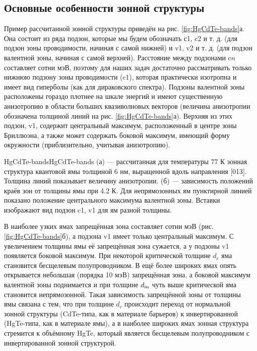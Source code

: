 \subsection{Основные особенности зонной структуры} \label{sec:HgCdTe-bandstructure}
Пример рассчитанной зонной структуры приведён на рис. \ref{fig:HgCdTe-bands}а. Она состоит из ряда подзон, которые мы будем обозначать с1, c2 и т. д. (для подзон зоны проводимости, начиная с самой нижней) и v1, v2 и т. д. (для подзон валентной зоны, начиная с самой верхней). Расстояние между подзонами c$n$ составляет сотни мэВ, поэтому для наших задач достаточно рассматривать только нижнюю подзону зоны проводимости (c1), которая практически изотропна и имеет вид гиперболы (как для дираковского спектра). Подзоны валентной зоны расположены гораздо плотнее на шкале энергий и имеют существенную анизотропию в области больших квазиволновых векторов (величина анизотропии обозначена толщиной линий на рис. \ref{fig:HgCdTe-bands}а). Верхняя из этих подзон, v1, содержит центральный максимум, расположенный в центре зоны Бриллюэна, а также может содержать боковой максимум, имеющий форму окружности (приблизительно, учитывая анизотропию).

\begin{fig}{HgCdTe-bands}{HgCdTe-bands} (а) --- рассчитанная для температуры 77 К зонная структура квантовой ямы \HgCdTe{} толщиной 6 нм, выращенной вдоль направления [013]. Толщина линий показывает величину анизотропии. (б) --- зависимость положений краёв зон от толщины ямы при 4.2 К. Для непрямозонных ям пунктирной линией показано положение центрального максимума валентной зоны. Вставки изображают вид подзон c1, v1 для ям разной толщины.
\end{fig}

В наиболее узких ямах запрещённая зона составляет сотни мэВ (рис. \ref{fig:HgCdTe-bands}б), а подзона v1 имеет только центральный максимум. С увеличением толщины ямы её запрещённая зона сужается, а у подзоны v1 появляется боковой максимум. При некоторой критической толщине $d_c$ яма становится бесщелевым полупроводником. В ещё более широких ямах опять открывается небольшая (порядка 10 мэВ) запрещённая зона, а боковой максимум валентной зоны поднимается и при толщине $d_{\rm in}$ чуть выше критической яма становится непрямозонной. Такая зависимость запрещённой зоны от толщины ямы связана с тем, что при толщине $d_c$ происходит переход от нормальной зонной структуры (CdTe-типа, как в материале барьеров) к инвертированной (HgTe-типа, как в материале ямы), а в наиболее широких ямах зонная структура стремится к объёмному HgTe, который является бесщелевым полупроводником с инвертированной зонной структурой.

